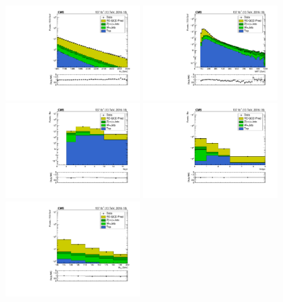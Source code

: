 \begin{figure}[!htbp]
  \begin{center}
    \includegraphics[width=0.46\textwidth]{figs/qcd/rs_data/c_crRSMT2SideBandInclusiveHT1200toInf_h_ht.pdf}
    \includegraphics[width=0.46\textwidth]{figs/qcd/rs_data/c_crRSMT2SideBandInclusiveHT1200toInf_h_met.pdf}
    \includegraphics[width=0.46\textwidth]{figs/qcd/rs_data/c_crRSMT2SideBandInclusiveHT1200toInf_h_nJet30.pdf}
    \includegraphics[width=0.46\textwidth]{figs/qcd/rs_data/c_crRSMT2SideBandInclusiveHT1200toInf_h_nBJet20.pdf}
    \includegraphics[width=0.46\textwidth]{figs/qcd/rs_data/c_crRSMT2SideBandInclusiveHT1200toInf_h_mt2.pdf}

\end{center}
\end{figure}
